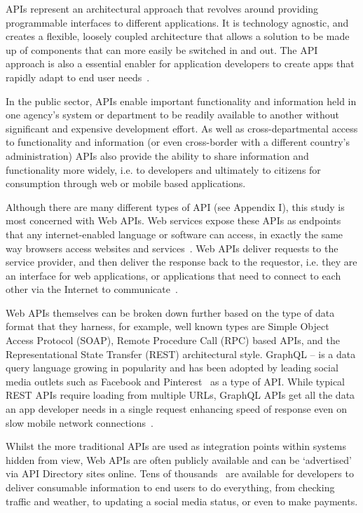 APIs represent an architectural approach that revolves around providing
programmable interfaces to different applications. It is technology agnostic,
and creates a flexible, loosely coupled architecture that allows a solution to be
made up of components that can more easily be switched in and out. The API approach
is also a essential enabler for application developers to create apps that rapidly adapt
to end user needs~\citep{hcl_tech}. 

In the public sector, APIs enable important functionality and information held in
one agency’s system or department to be readily available to another without
significant and expensive development effort. As well as cross-departmental
access to functionality and information (or even cross-border with a
different country’s administration) APIs also provide the ability to share
information and functionality more widely, i.e. to developers and ultimately
to citizens for consumption through web or mobile based applications.

Although there are many different types of API (see Appendix I), this study is
most concerned with Web APIs. Web services expose these APIs as endpoints that
any internet-enabled language or software can access, in exactly the same way
browsers access websites and services~\citep{fed_tech}. Web APIs deliver requests to the
service provider, and then deliver the response back to the requestor,
i.e. they are an interface for web applications, or applications that need to
connect to each other via the Internet to communicate~\citep{define_api}.

Web APIs themselves can be broken down further based on the type of data format
that they harness, for example, well known types are Simple Object Access Protocol
(SOAP), Remote Procedure Call (RPC) based APIs, and the Representational State
Transfer (REST) architectural style. GraphQL – is a data query language growing
in popularity and has been adopted by leading social media outlets such as Facebook
and Pinterest~\citep{graphql} as a type of API. While typical REST APIs require loading
from multiple URLs, GraphQL APIs get all the data an app developer needs in a single
request enhancing speed of response even on slow mobile network connections~\citep{graphql}.

Whilst the more traditional APIs are used as integration points within systems
hidden from view, Web APIs are often publicly available and can be ‘advertised’
via API Directory sites online. Tens of thousands~\citep{programmableweb_search} are available for developers
to deliver consumable information to end users to do everything, from checking
traffic and weather, to updating a social media status, or even to make payments.

